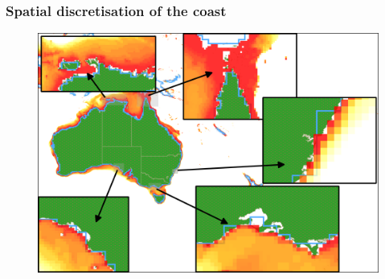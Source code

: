 \begin{frame}
\frametitle{Spatial discretisation of the coast}
    \begin{figure}      
    \includegraphics[width=\textwidth]{figures/maps/omaps_masks.png}
    \end{figure}
\end{frame}
